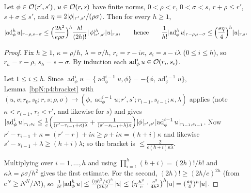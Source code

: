 \begin{lemma}\label{bpN:p5:adjoint}
Let $\phi\in\mathcal O(r',s')$, $u\in\mathcal O(r,s)$ have finite norms, $0<\rho<r$, $0<\sigma<s$, $r+\rho\le r'$, $s+\sigma\le s'$, and $\eta=2\lvert \phi\rvert_{r',s'}/(\rho\sigma)$. Then for every $h\ge1$,
\[\lvert \operatorname{ad}^h_\phi u\rvert_{r-\rho,s-\sigma}\le\Bigl(\frac{2h^2}{e\rho\sigma}\Bigr)^h\frac{h!}{(2h)!}\,\lvert \phi\rvert_{r',s'}^h\lvert u\rvert_{r,s},\qquad\text{hence}\qquad\frac1{h!}\lvert \operatorname{ad}^h_\phi u\rvert_{r-\rho,s-\sigma}\le\Bigl(\frac{e\eta}4\Bigr)^h\lvert u\rvert_{r,s}.\]
\end{lemma}
\begin{proof}
\label{stepN:p5:ad-setup} Fix $h\ge1$, $\kappa=\rho/h$, $\lambda=\sigma/h$, $r_i=r-i\kappa$, $s_i=s-i\lambda$ ($0\le i\le h$), so $r_h=r-\rho$, $s_h=s-\sigma$. By induction each $\operatorname{ad}^i_\phi u\in\mathcal O(r_i,s_i)$.

\label{stepN:p5:ad-step} Let $1\le i\le h$. Since $\operatorname{ad}^i_\phi u=\{\operatorname{ad}^{i-1}_\phi u,\phi\}=-\{\phi,\operatorname{ad}^{i-1}_\phi u\}$, Lemma~\ref{bpN:p4:bracket} with $(u,v;r_0,s_0;r,s;\rho,\sigma)\to(\phi,\operatorname{ad}^{i-1}_\phi u;r',s';r_{i-1},s_{i-1};\kappa,\lambda)$ applies (note $\kappa<r_{i-1}$, $r_i<r'$, and likewise for $s$) and gives
$\lvert \operatorname{ad}^i_\phi u\rvert_{r_i,s_i}\le\frac1e\Bigl(\frac1{(r'-r_{i-1}+\kappa)\lambda}+\frac1{(s'-s_{i-1}+\lambda)\kappa}\Bigr)\lvert \phi\rvert_{r',s'}\lvert \operatorname{ad}^{i-1}_\phi u\rvert_{r_{i-1},s_{i-1}}$.
Now $r'-r_{i-1}+\kappa=(r'-r)+i\kappa\ge\rho+i\kappa=(h+i)\kappa$ and likewise $s'-s_{i-1}+\lambda\ge(h+i)\lambda$; so the bracket is $\le\frac{2}{e(h+i)\kappa\lambda}$.

\label{stepN:p5:ad-product} Multiplying over $i=1,\dots,h$ and using $\prod_{i=1}^h(h+i)=(2h)!/h!$ and $\kappa\lambda=\rho\sigma/h^2$ gives the first estimate. For the second, $(2h)!\ge(2h/e)^{2h}$ (from $e^N\ge N^N/N!$), so
$\frac1{h!}\lvert \operatorname{ad}^h_\phi u\rvert\le\frac{(\eta h^2/e)^h}{(2h)!}\lvert u\rvert\le\bigl(\eta\frac{h^2}e\cdot\frac{e^2}{4h^2}\bigr)^h\lvert u\rvert=(\frac{e\eta}4)^h\lvert u\rvert$.
\end{proof}

